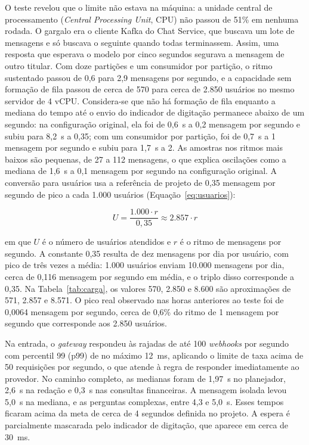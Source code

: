 O teste revelou que o limite não estava na máquina: a unidade central de processamento (\textit{Central Processing Unit}, CPU) não passou de 51\% em nenhuma rodada. O gargalo era o cliente Kafka do Chat Service, que buscava um lote de mensagens e só buscava o seguinte quando todas terminassem. Assim, uma resposta que esperava o modelo por cinco segundos segurava a mensagem de outro titular. Com doze partições e um consumidor por partição, o ritmo sustentado passou de 0,6 para 2,9 mensagens por segundo, e a capacidade sem formação de fila passou de cerca de 570 para cerca de 2.850 usuários no mesmo servidor de 4 vCPU. Considera-se que não há formação de fila enquanto a mediana do tempo até o envio do indicador de digitação permanece abaixo de um segundo: na configuração original, ela foi de 0,6~s a 0,2 mensagem por segundo e subiu para 8,2~s a 0,35; com um consumidor por partição, foi de 0,7~s a 1 mensagem por segundo e subiu para 1,7~s a 2. As amostras nos ritmos mais baixos são pequenas, de 27 a 112 mensagens, o que explica oscilações como a mediana de 1,6~s a 0,1 mensagem por segundo na configuração original. A conversão para usuários usa a referência de projeto de 0,35 mensagem por segundo de pico a cada 1.000 usuários (Equação~\ref{eq:usuarios}):

\begin{equation}
U = \frac{1{.}000 \cdot r}{0{,}35} \approx 2{.}857 \cdot r
\label{eq:usuarios}
\end{equation}

\noindent em que $U$ é o número de usuários atendidos e $r$ é o ritmo de mensagens por segundo. A constante 0,35 resulta de dez mensagens por dia por usuário, com pico de três vezes a média: 1.000 usuários enviam 10.000 mensagens por dia, cerca de 0,116 mensagem por segundo em média, e o triplo disso corresponde a 0,35. Na Tabela~\ref{tab:carga}, os valores 570, 2.850 e 8.600 são aproximações de 571, 2.857 e 8.571. O pico real observado nas horas anteriores ao teste foi de 0,0064 mensagem por segundo, cerca de 0,6\% do ritmo de 1 mensagem por segundo que corresponde aos 2.850 usuários.

Na entrada, o \textit{gateway} respondeu às rajadas de até 100 \textit{webhooks} por segundo com percentil 99 (p99) de no máximo 12~ms, aplicando o limite de taxa acima de 50 requisições por segundo, o que atende à regra de responder imediatamente ao provedor. No caminho completo, as medianas foram de 1,97~s no planejador, 2,6~s na redação e 0,3~s nas consultas financeiras. A mensagem isolada levou 5,0~s na mediana, e as perguntas complexas, entre 4,3 e 5,0~s. Esses tempos ficaram acima da meta de cerca de 4 segundos definida no projeto. A espera é parcialmente mascarada pelo indicador de digitação, que aparece em cerca de 30~ms.

